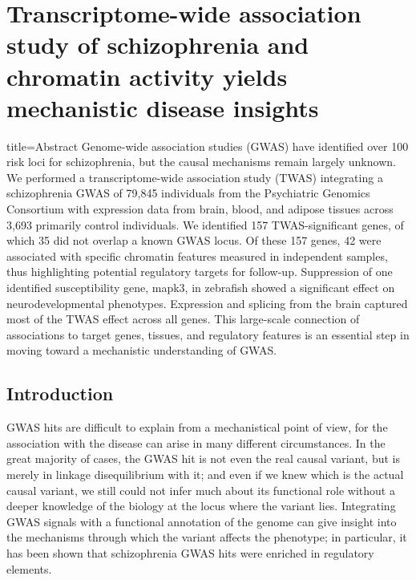 \documentclass[../main.tex]{subfiles}
\begin{document}
\chapter{Transcriptome-wide association study of schizophrenia and 
chromatin activity yields mechanistic disease insights}

\begin{external_abstract}{title=Abstract}
Genome-wide association studies (GWAS) have identified over 100 risk 
loci for schizophrenia, but the causal mechanisms remain largely 
unknown. We performed a transcriptome-wide association study (TWAS) 
integrating a schizophrenia GWAS of 79,845 individuals from the 
Psychiatric Genomics Consortium with expression data from brain, blood, 
and adipose tissues across 3,693 primarily control individuals. We 
identified 157 TWAS-significant genes, of which 35 did not overlap a 
known GWAS locus. Of these 157 genes, 42 were associated with specific 
chromatin features measured in independent samples, thus highlighting 
potential regulatory targets for follow-up. Suppression of one 
identified susceptibility gene, mapk3, in zebrafish showed a significant 
effect on neurodevelopmental phenotypes. Expression and splicing from 
the brain captured most of the TWAS effect across all genes. This 
large-scale connection of associations to target genes, tissues, and 
regulatory features is an essential step in moving toward a mechanistic 
understanding of GWAS.
\end{external_abstract}

\section{Introduction}

GWAS hits are difficult to explain from a mechanistical point of view, 
for the association with the disease can arise in many different 
circumstances. In the great majority of cases, the GWAS hit is not even 
the real causal variant, but is merely in linkage disequilibrium with 
it; and even if we knew which is the actual causal variant, we still 
could not infer much about its functional role without a deeper 
knowledge of the biology at the locus where the variant lies. 
Integrating GWAS signals with a functional annotation of the genome can 
give insight into the mechanisms through which the variant affects the 
phenotype; in particular, it has been shown that schizophrenia GWAS hits 
were enriched in regulatory elements.
\end{document}
